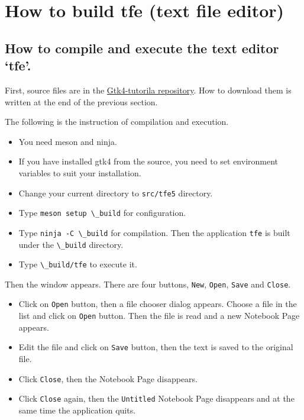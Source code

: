 \section{How to build tfe (text file
editor)}\label{how-to-build-tfe-text-file-editor}

\subsection{How to compile and execute the text editor
`tfe'.}\label{how-to-compile-and-execute-the-text-editor-tfe.}

First, source files are in the
\href{https://github.com/ToshioCP/Gtk4-tutorial}{Gtk4-tutorila
repository}. How to download them is written at the end of the previous
section.

The following is the instruction of compilation and execution.

\begin{itemize}
\tightlist
\item
  You need meson and ninja.
\item
  If you have installed gtk4 from the source, you need to set
  environment variables to suit your installation.
\item
  Change your current directory to \passthrough{\lstinline!src/tfe5!}
  directory.
\item
  Type \passthrough{\lstinline!meson setup \_build!} for configuration.
\item
  Type \passthrough{\lstinline!ninja -C \_build!} for compilation. Then
  the application \passthrough{\lstinline!tfe!} is built under the
  \passthrough{\lstinline!\_build!} directory.
\item
  Type \passthrough{\lstinline!\_build/tfe!} to execute it.
\end{itemize}

Then the window appears. There are four buttons,
\passthrough{\lstinline!New!}, \passthrough{\lstinline!Open!},
\passthrough{\lstinline!Save!} and \passthrough{\lstinline!Close!}.

\begin{itemize}
\tightlist
\item
  Click on \passthrough{\lstinline!Open!} button, then a file chooser
  dialog appears. Choose a file in the list and click on
  \passthrough{\lstinline!Open!} button. Then the file is read and a new
  Notebook Page appears.
\item
  Edit the file and click on \passthrough{\lstinline!Save!} button, then
  the text is saved to the original file.
\item
  Click \passthrough{\lstinline!Close!}, then the Notebook Page
  disappears.
\item
  Click \passthrough{\lstinline!Close!} again, then the
  \passthrough{\lstinline!Untitled!} Notebook Page disappears and at the
  same time the application quits.
\end{itemize}

